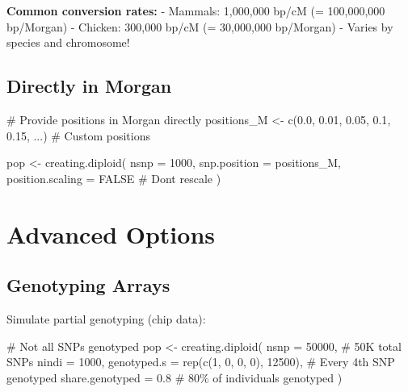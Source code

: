 \documentclass[
  letterpaper,
]{book}
\newenvironment{Shaded}{\begin{snugshade}}{\end{snugshade}}
\newcommand{\AttributeTok}[1]{\textcolor[rgb]{0.40,0.45,0.13}{#1}}
\newcommand{\CommentTok}[1]{\textcolor[rgb]{0.37,0.37,0.37}{#1}}
\newcommand{\ConstantTok}[1]{\textcolor[rgb]{0.56,0.35,0.01}{#1}}
\newcommand{\DecValTok}[1]{\textcolor[rgb]{0.68,0.00,0.00}{#1}}
\newcommand{\FloatTok}[1]{\textcolor[rgb]{0.68,0.00,0.00}{#1}}
\newcommand{\FunctionTok}[1]{\textcolor[rgb]{0.28,0.35,0.67}{#1}}
\newcommand{\NormalTok}[1]{\textcolor[rgb]{0.00,0.23,0.31}{#1}}
\newcommand{\OtherTok}[1]{\textcolor[rgb]{0.00,0.23,0.31}{#1}}
\begin{document}
\textbf{Common conversion rates:} - Mammals: 1,000,000 bp/cM (=
100,000,000 bp/Morgan) - Chicken: 300,000 bp/cM (= 30,000,000 bp/Morgan)
- Varies by species and chromosome!

\subsection{Directly in Morgan}\label{directly-in-morgan}

\begin{Shaded}
\begin{Highlighting}[]
\CommentTok{\# Provide positions in Morgan directly}
\NormalTok{positions\_M }\OtherTok{\textless{}{-}} \FunctionTok{c}\NormalTok{(}\FloatTok{0.0}\NormalTok{, }\FloatTok{0.01}\NormalTok{, }\FloatTok{0.05}\NormalTok{, }\FloatTok{0.1}\NormalTok{, }\FloatTok{0.15}\NormalTok{, ...)  }\CommentTok{\# Custom positions}

\NormalTok{pop }\OtherTok{\textless{}{-}} \FunctionTok{creating.diploid}\NormalTok{(}
  \AttributeTok{nsnp =} \DecValTok{1000}\NormalTok{,}
  \AttributeTok{snp.position =}\NormalTok{ positions\_M,}
  \AttributeTok{position.scaling =} \ConstantTok{FALSE}  \CommentTok{\# Don\textquotesingle{}t rescale}
\NormalTok{)}
\end{Highlighting}
\end{Shaded}

\section{Advanced Options}\label{sec-advanced-options}

\subsection{Genotyping Arrays}\label{genotyping-arrays}

Simulate partial genotyping (chip data):

\begin{Shaded}
\begin{Highlighting}[]
\CommentTok{\# Not all SNPs genotyped}
\NormalTok{pop }\OtherTok{\textless{}{-}} \FunctionTok{creating.diploid}\NormalTok{(}
  \AttributeTok{nsnp =} \DecValTok{50000}\NormalTok{,          }\CommentTok{\# 50K total SNPs}
  \AttributeTok{nindi =} \DecValTok{1000}\NormalTok{,}
  \AttributeTok{genotyped.s =} \FunctionTok{rep}\NormalTok{(}\FunctionTok{c}\NormalTok{(}\DecValTok{1}\NormalTok{, }\DecValTok{0}\NormalTok{, }\DecValTok{0}\NormalTok{, }\DecValTok{0}\NormalTok{), }\DecValTok{12500}\NormalTok{),  }\CommentTok{\# Every 4th SNP genotyped}
  \AttributeTok{share.genotyped =} \FloatTok{0.8}  \CommentTok{\# 80\% of individuals genotyped}
\NormalTok{)}
\end{Highlighting}
\end{Shaded}
\end{document}
